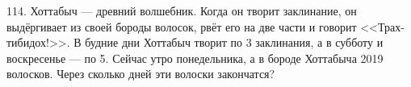 114. Хоттабыч --- древний волшебник. Когда он творит заклинание, он выдёргивает из своей бороды волосок, рвёт его на две части и говорит <<Трах-тибидох!>>. В будние дни Хоттабыч творит по 3 заклинания, а в субботу и воскресенье --- по 5. Сейчас утро понедельника, а в бороде Хоттабыча 2019
волосков. Через сколько дней эти волоски закончатся?\\

